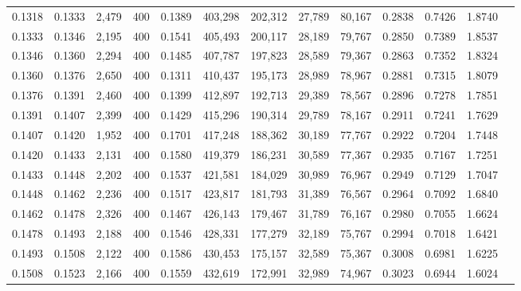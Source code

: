 \begin{tabular}{rrrrrrrrrrrrr}
0.1318 & 0.1333 &  2,479 &   400 &                                     0.1389 & 403,298 & 202,312 &  27,789 &  80,167 & 0.2838 & 0.7426 & 1.8740 \\
0.1333 & 0.1346 &  2,195 &   400 &                                     0.1541 & 405,493 & 200,117 &  28,189 &  79,767 & 0.2850 & 0.7389 & 1.8537 \\
0.1346 & 0.1360 &  2,294 &   400 &                                     0.1485 & 407,787 & 197,823 &  28,589 &  79,367 & 0.2863 & 0.7352 & 1.8324 \\
0.1360 & 0.1376 &  2,650 &   400 &                                     0.1311 & 410,437 & 195,173 &  28,989 &  78,967 & 0.2881 & 0.7315 & 1.8079 \\
0.1376 & 0.1391 &  2,460 &   400 &                                     0.1399 & 412,897 & 192,713 &  29,389 &  78,567 & 0.2896 & 0.7278 & 1.7851 \\
0.1391 & 0.1407 &  2,399 &   400 &                                     0.1429 & 415,296 & 190,314 &  29,789 &  78,167 & 0.2911 & 0.7241 & 1.7629 \\
0.1407 & 0.1420 &  1,952 &   400 &                                     0.1701 & 417,248 & 188,362 &  30,189 &  77,767 & 0.2922 & 0.7204 & 1.7448 \\
0.1420 & 0.1433 &  2,131 &   400 &                                     0.1580 & 419,379 & 186,231 &  30,589 &  77,367 & 0.2935 & 0.7167 & 1.7251 \\
0.1433 & 0.1448 &  2,202 &   400 &                                     0.1537 & 421,581 & 184,029 &  30,989 &  76,967 & 0.2949 & 0.7129 & 1.7047 \\
0.1448 & 0.1462 &  2,236 &   400 &                                     0.1517 & 423,817 & 181,793 &  31,389 &  76,567 & 0.2964 & 0.7092 & 1.6840 \\
0.1462 & 0.1478 &  2,326 &   400 &                                     0.1467 & 426,143 & 179,467 &  31,789 &  76,167 & 0.2980 & 0.7055 & 1.6624 \\
0.1478 & 0.1493 &  2,188 &   400 &                                     0.1546 & 428,331 & 177,279 &  32,189 &  75,767 & 0.2994 & 0.7018 & 1.6421 \\
0.1493 & 0.1508 &  2,122 &   400 &                                     0.1586 & 430,453 & 175,157 &  32,589 &  75,367 & 0.3008 & 0.6981 & 1.6225 \\
0.1508 & 0.1523 &  2,166 &   400 &                                     0.1559 & 432,619 & 172,991 &  32,989 &  74,967 & 0.3023 & 0.6944 & 1.6024 \\

\end{tabular}
